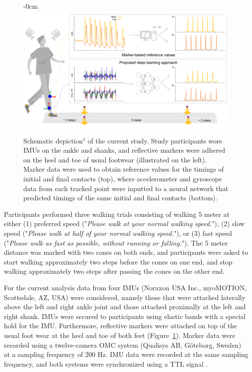 \documentclass[sensors,article,submit,pdftex,moreauthors]{Definitions/mdpi}
\begin{document}
\begin{figure}[H]
	\begin{adjustwidth}{-\extralength}{0cm}
		\centering
		\includegraphics[width=13.5cm]{fig/methods_overall_workflow.pdf}
	\end{adjustwidth}
	\caption{Schematic depiction$^{1}$ of the current study. Study participants wore IMUs on the ankle and shanks, and reflective markers were adhered on the heel and toe of usual footwear (illustrated on the left). Marker data were used to obtain reference values for the timings of initial and final contacts (top), where accelerometer and gyroscope data from each tracked point were inputted to a neural network that predicted timings of the same initial and final contacts (bottom). \newline {} \label{fig:methods_marker_vs_imu}}
\end{figure}  

Participants performed three walking trials consisting of walking 5 meter at either (1) preferred speed ("\emph{Please walk at your normal walking speed.}"), (2) slow speed ("\emph{Please walk at half of your normal walking speed.}"), or (3) fast speed ("\emph{Please walk as fast as possible, without running or falling.}"). The 5 meter distance was marked with two cones on both ends, and participants were asked to start walking approximately two steps before the cones on one end, and stop walking approximately two steps after passing the cones on the other end.

For the current analysis data from four IMUs (Noraxon USA Inc., myoMOTION, Scottsdale, AZ, USA) were considered, namely those that were attached laterally above the left and right ankle joint and those attached proximally at the left and right shank. IMUs were secured to participants using elastic bands with a special hold for the IMU. Furthermore, reflective markers were attached on top of the usual foot wear at the heel and toe of both feet (Figure~\ref{fig:methods_marker_vs_imu}). Marker data were recorded using a twelve-camera OMC system (Qualisys AB, G\"{o}teborg, Sweden) at a sampling frequency of 200 Hz. IMU data were recorded at the same sampling frequency, and both systems were synchronized using a TTL signal \cite{Warmerdam2021}.
\end{document}
